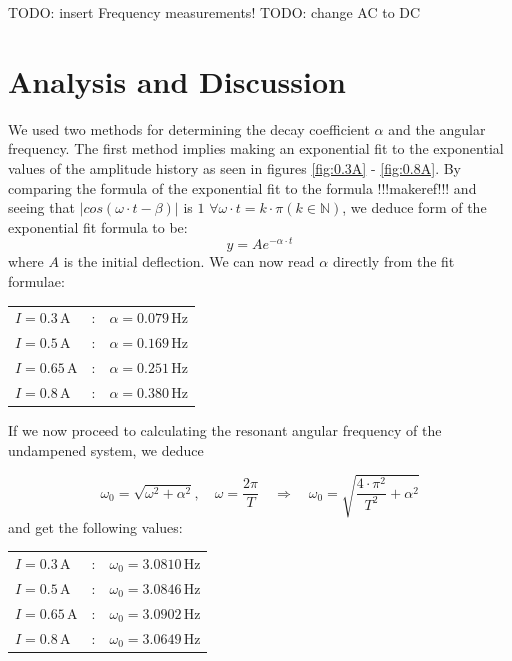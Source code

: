 \documentclass{scrreprt}
\newcommand{\unit}[1]{\ensuremath{\, \mathrm{#1}}}
\begin{document}
TODO: insert Frequency measurements!
TODO: change AC to DC

\section{Analysis and Discussion}
We used two methods for determining the decay coefficient $\alpha$ and the angular frequency. The first method implies making an exponential fit to the exponential values of the amplitude history as seen in figures \ref{fig:0.3A} - \ref{fig:0.8A}.  By comparing the formula of the exponential fit to the formula !!!makeref!!! and seeing that $\lvert cos(\omega\cdot t-\beta)\rvert$ is $1$ $\forall \omega \cdot t = k \cdot \pi (k \in \mathbb{N})$, we deduce form of the exponential fit formula to be:
\begin{equation}
y = Ae^{- \alpha \cdot t}
\end{equation}
where $A$ is the initial deflection.
We can now read $\alpha$ directly from the fit formulae:

\begin{table}[H]
\center
\begin{tabular}{lcl}
$I = 0.3 \unit{A}$ &:& $\alpha = 0.079\unit{Hz}$\\
$I = 0.5 \unit{A}$ &:& $\alpha = 0.169\unit{Hz}$\\
$I = 0.65 \unit{A}$ &:& $\alpha = 0.251\unit{Hz}$\\
$I = 0.8 \unit{A}$ &:& $\alpha = 0.380\unit{Hz}$
\end{tabular}
\end{table}

If we now proceed to calculating the resonant angular frequency of the undampened system, we deduce

\begin{equation}
\omega_0 = \sqrt{\omega^2+\alpha^2}, \quad \omega = \frac{2 \pi}{T} \quad \Longrightarrow \quad \omega_0 = \sqrt{\frac{4\cdot\pi^2}{T^2} + \alpha^2}
\end{equation}
and get the following values:

\begin{table}[H]
\center
\begin{tabular}{lcl}
$I = 0.3 \unit{A}$ &:& $\omega_0 = 3.0810\unit{Hz}$\\
$I = 0.5 \unit{A}$ &:& $\omega_0 = 3.0846\unit{Hz}$\\
$I = 0.65 \unit{A}$ &:& $\omega_0 = 3.0902\unit{Hz}$\\
$I = 0.8 \unit{A}$ &:& $\omega_0 = 3.0649\unit{Hz}$
\end{tabular}
\end{table}
\end{document}
